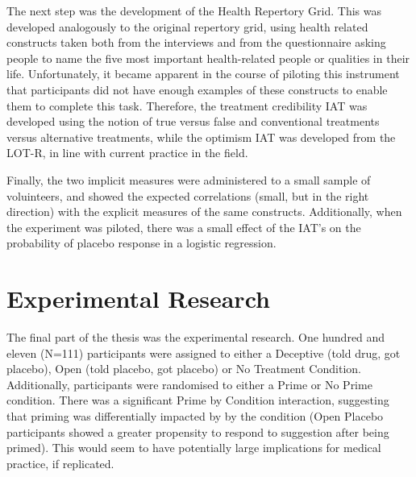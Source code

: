 The next step was the development of the Health Repertory Grid. This was developed analogously to the original repertory grid, using health related constructs taken both from the interviews and from the questionnaire asking people to name the five most important health-related people or qualities in their life. Unfortunately, it became apparent in the course of piloting this instrument that participants did not have enough examples of these constructs to enable them to complete this task. Therefore, the treatment credibility IAT was developed using the notion of true versus false and conventional treatments versus alternative treatments, while the optimism IAT was developed from the LOT-R, in line with current practice in the field. 

Finally, the two implicit measures were administered to a small sample of voluinteers, and showed the expected correlations (small, but in the right direction) with the explicit measures of the same constructs. Additionally, when the experiment was piloted, there was a small effect of the IAT's on the probability of placebo response in a logistic regression. 

\section{Experimental Research}
\label{sec:exper-rese}

The final part of the thesis was the experimental research. One hundred and eleven (N=111) participants were assigned to either a Deceptive (told drug, got placebo), Open (told placebo, got placebo) or No Treatment Condition. Additionally, participants were randomised to either a Prime or No Prime condition. %
There was a significant Prime by Condition interaction, suggesting that priming was differentially impacted by by the condition (Open Placebo participants showed a greater propensity to respond to suggestion after being primed). This would seem to have potentially large implications for medical practice, if replicated. 

